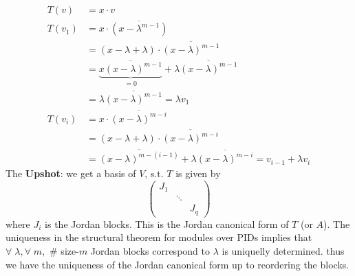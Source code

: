 \[
	\begin{aligned}
		T(v)   & = x \cdot v                                                                              \\
		T(v_1) & = x \cdot \overline{(x-\lambda^{m-1})}                                                   \\
		       & = (x-\lambda + \lambda) \cdot \overline{(x-\lambda)^{m-1}}                               \\
		       & = \underbrace{\overline{x(x-\lambda)^{m-1}}}_{=0} + \lambda \overline{(x-\lambda)^{m-1}}
		\\
		       & = \lambda\overline{(x-\lambda)^{m-1}} = \lambda v_1                                      \\
		T(v_i) & = x\cdot \overline{(x-\lambda)^{m-i}}                                                    \\
		       & = (x-\lambda + \lambda) \cdot \overline{(x-\lambda)^{m-i}}                               \\
		       & = \overline{(x-\lambda)^{m-(i-1)}} + \lambda\overline{(x-\lambda)^{m-i}} = v_{i-1} +
		\lambda {v_i}
	\end{aligned}
\]
The \textbf{Upshot}: we get a basis of \( V \), s.t. \( T \) is given by
\[
	\begin{pmatrix}
		J_1 &        &     \\
		    & \ddots &     \\
		    &        & J_q
	\end{pmatrix}
\]
where \( J_i \) is the Jordan blocks. This is the Jordan canonical form of \( T \) (or \( A \)). The
uniqueness in the structural theorem for modules over PIDs implies that \( \forall \; \lambda,
\forall \; m, \) \# size-\( m \) Jordan blocks correspond to \( \lambda \) is uniquelly determined.
thus we have the uniqueness of the Jordan canonical form up to reordering the blocks.

